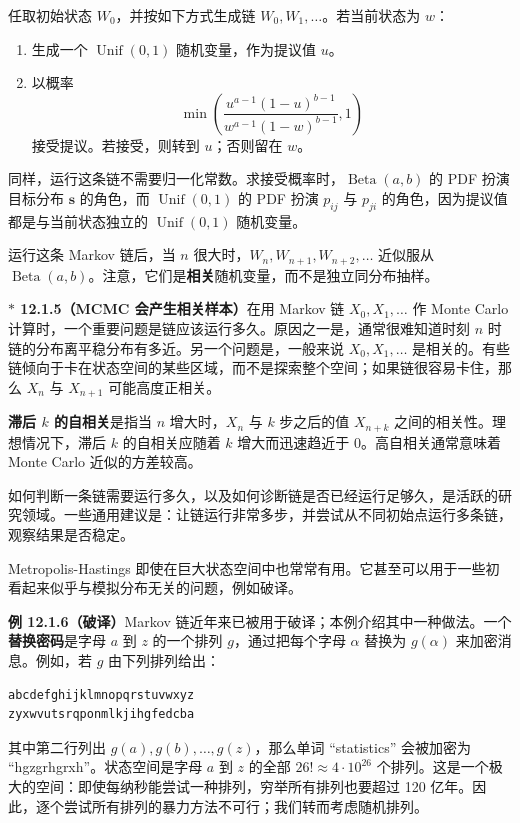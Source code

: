 \documentclass[UTF8, 12pt, fontset=fandol, oneside]{ctexart}
\newcommand{\biohazard}{\ensuremath{\ast}}
\begin{document}
任取初始状态 $W_0$，并按如下方式生成链 $W_0,W_1,\ldots$。若当前状态为 $w$：
\begin{enumerate}
  \item 生成一个 $\operatorname{Unif}(0,1)$ 随机变量，作为提议值 $u$。
  \item 以概率
  \[
    \min\left(
      \frac{u^{a-1}(1-u)^{b-1}}{w^{a-1}(1-w)^{b-1}},
      1
    \right)
  \]
  接受提议。若接受，则转到 $u$；否则留在 $w$。
\end{enumerate}

同样，运行这条链不需要归一化常数。求接受概率时，$\operatorname{Beta}(a,b)$ 的 PDF 扮演目标分布 $\mathbf s$ 的角色，而 $\operatorname{Unif}(0,1)$ 的 PDF 扮演 $p_{ij}$ 与 $p_{ji}$ 的角色，因为提议值都是与当前状态独立的 $\operatorname{Unif}(0,1)$ 随机变量。

运行这条 Markov 链后，当 $n$ 很大时，$W_n,W_{n+1},W_{n+2},\ldots$ 近似服从 $\operatorname{Beta}(a,b)$。注意，它们是\textbf{相关}随机变量，而不是独立同分布抽样。

\noindent\textbf{$\biohazard$ 12.1.5（MCMC 会产生相关样本）}\quad 在用 Markov 链 $X_0,X_1,\ldots$ 作 Monte Carlo 计算时，一个重要问题是链应该运行多久。原因之一是，通常很难知道时刻 $n$ 时链的分布离平稳分布有多近。另一个问题是，一般来说 $X_0,X_1,\ldots$ 是相关的。有些链倾向于卡在状态空间的某些区域，而不是探索整个空间；如果链很容易卡住，那么 $X_n$ 与 $X_{n+1}$ 可能高度正相关。

\textbf{滞后 $k$ 的自相关}是指当 $n$ 增大时，$X_n$ 与 $k$ 步之后的值 $X_{n+k}$ 之间的相关性。理想情况下，滞后 $k$ 的自相关应随着 $k$ 增大而迅速趋近于 $0$。高自相关通常意味着 Monte Carlo 近似的方差较高。

如何判断一条链需要运行多久，以及如何诊断链是否已经运行足够久，是活跃的研究领域。一些通用建议是：让链运行非常多步，并尝试从不同初始点运行多条链，观察结果是否稳定。

Metropolis-Hastings 即使在巨大状态空间中也常常有用。它甚至可以用于一些初看起来似乎与模拟分布无关的问题，例如破译。

\noindent\textbf{例 12.1.6（破译）}\quad Markov 链近年来已被用于破译；本例介绍其中一种做法。一个\textbf{替换密码}是字母 $a$ 到 $z$ 的一个排列 $g$，通过把每个字母 $\alpha$ 替换为 $g(\alpha)$ 来加密消息。例如，若 $g$ 由下列排列给出：
\begin{verbatim}
abcdefghijklmnopqrstuvwxyz
zyxwvutsrqponmlkjihgfedcba
\end{verbatim}
其中第二行列出 $g(a),g(b),\ldots,g(z)$，那么单词 ``statistics'' 会被加密为 ``hgzgrhgrxh''。状态空间是字母 $a$ 到 $z$ 的全部 $26!\approx4\cdot10^{26}$ 个排列。这是一个极大的空间：即使每纳秒能尝试一种排列，穷举所有排列也要超过 120 亿年。因此，逐个尝试所有排列的暴力方法不可行；我们转而考虑随机排列。
\end{document}
